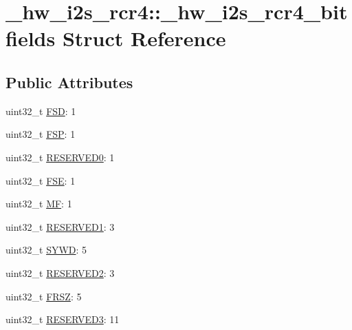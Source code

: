 \hypertarget{struct__hw__i2s__rcr4_1_1__hw__i2s__rcr4__bitfields}{}\section{\+\_\+hw\+\_\+i2s\+\_\+rcr4\+:\+:\+\_\+hw\+\_\+i2s\+\_\+rcr4\+\_\+bitfields Struct Reference}
\label{struct__hw__i2s__rcr4_1_1__hw__i2s__rcr4__bitfields}
\subsection*{Public Attributes}
\begin{DoxyCompactItemize}
\item 
uint32\+\_\+t \hyperlink{struct__hw__i2s__rcr4_1_1__hw__i2s__rcr4__bitfields_a149b6e77eb80542a0fe15460f12cdafc}{F\+SD}\+: 1
\item 
uint32\+\_\+t \hyperlink{struct__hw__i2s__rcr4_1_1__hw__i2s__rcr4__bitfields_a2fca360df4d68484df70021f7ab74161}{F\+SP}\+: 1
\item 
uint32\+\_\+t \hyperlink{struct__hw__i2s__rcr4_1_1__hw__i2s__rcr4__bitfields_a7661c7850dac2662d54d334949c7cf36}{R\+E\+S\+E\+R\+V\+E\+D0}\+: 1
\item 
uint32\+\_\+t \hyperlink{struct__hw__i2s__rcr4_1_1__hw__i2s__rcr4__bitfields_ad7ab7e01a34b3b55d6495bf3bb9fb0df}{F\+SE}\+: 1
\item 
uint32\+\_\+t \hyperlink{struct__hw__i2s__rcr4_1_1__hw__i2s__rcr4__bitfields_a48019f68da95281ab81a59b47f3ea330}{MF}\+: 1
\item 
uint32\+\_\+t \hyperlink{struct__hw__i2s__rcr4_1_1__hw__i2s__rcr4__bitfields_aaa6d4809671eb30bf4db825edd24fd86}{R\+E\+S\+E\+R\+V\+E\+D1}\+: 3
\item 
uint32\+\_\+t \hyperlink{struct__hw__i2s__rcr4_1_1__hw__i2s__rcr4__bitfields_a2a6985cd493a24b05125920fa5e0addd}{S\+Y\+WD}\+: 5
\item 
uint32\+\_\+t \hyperlink{struct__hw__i2s__rcr4_1_1__hw__i2s__rcr4__bitfields_aae1922a88c7b3c257cc7efbb6ecf1f29}{R\+E\+S\+E\+R\+V\+E\+D2}\+: 3
\item 
uint32\+\_\+t \hyperlink{struct__hw__i2s__rcr4_1_1__hw__i2s__rcr4__bitfields_a2d95ceaafe6a2b9db694aad6d60eb0a5}{F\+R\+SZ}\+: 5
\item 
uint32\+\_\+t \hyperlink{struct__hw__i2s__rcr4_1_1__hw__i2s__rcr4__bitfields_a230159e4e5ba244ddac18d762460d4f5}{R\+E\+S\+E\+R\+V\+E\+D3}\+: 11
\end{DoxyCompactItemize}



